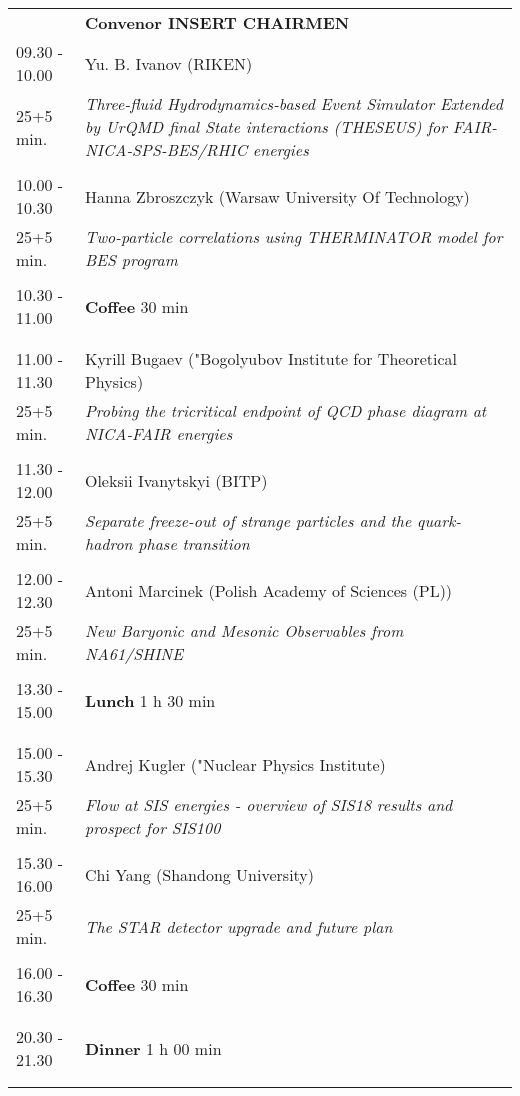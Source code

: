 \begin{longtable}{p{3cm}p{13cm}}
&\hfill {\bf Convenor INSERT CHAIRMEN }\\ 
09.30 - 10.00 & Yu. B. Ivanov (RIKEN)\\ 
25+5 min. & {\it Three-fluid Hydrodynamics-based Event Simulator Extended by UrQMD final State interactions  (THESEUS) for FAIR-NICA-SPS-BES/RHIC energies}\\ 
 & \\ 
10.00 - 10.30 & Hanna Zbroszczyk (Warsaw University Of Technology)\\ 
25+5 min. & {\it Two-particle correlations using THERMINATOR model for BES program}\\ 
 & \\ 
10.30 - 11.00 & {\bf Coffee} \hfill 30 min \\ 
 & \\ 
 & \\ 
11.00 - 11.30 & Kyrill Bugaev ("Bogolyubov Institute for Theoretical Physics)\\ 
25+5 min. & {\it Probing the tricritical endpoint of QCD phase diagram at NICA-FAIR energies}\\ 
 & \\ 
11.30 - 12.00 & Oleksii Ivanytskyi (BITP)\\ 
25+5 min. & {\it Separate freeze-out of strange particles and the quark-hadron phase transition}\\ 
 & \\ 
12.00 - 12.30 & Antoni Marcinek (Polish Academy of Sciences (PL))\\ 
25+5 min. & {\it New Baryonic and Mesonic Observables from NA61/SHINE}\\ 
 & \\ 
13.30 - 15.00 & {\bf Lunch} \hfill 1 h 30 min \\ 
 & \\ 
 & \\ 
15.00 - 15.30 & Andrej Kugler ("Nuclear Physics Institute)\\ 
25+5 min. & {\it Flow at SIS energies - overview of SIS18 results and prospect for SIS100}\\ 
 & \\ 
15.30 - 16.00 & Chi Yang (Shandong University)\\ 
25+5 min. & {\it The STAR detector upgrade and future plan}\\ 
 & \\ 
16.00 - 16.30 & {\bf Coffee} \hfill 30 min \\ 
 & \\ 
 & \\ 
20.30 - 21.30 & {\bf Dinner} \hfill 1 h 00 min \\ 
 & \\ 
 & \\ 
\end{longtable}

